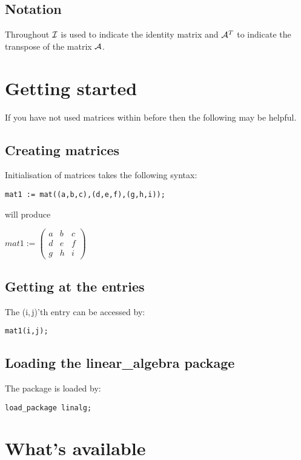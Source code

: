 \subsection*{Notation}

Throughout ${\cal I}$ is used to indicate the identity matrix and
${\cal A}^T$ to indicate the transpose of the matrix ${\cal A}$.

\section{Getting started}

If you have not used matrices within {\REDUCE} before then the
following may be helpful.

\subsection*{Creating matrices}

Initialisation of matrices takes the following syntax:

{\tt mat1 := mat((a,b,c),(d,e,f),(g,h,i));}

will produce

\begin{flushleft}
\begin{math}
mat1 := \left( \begin{array}{ccc} a & b & c \\ d & e & f \\ g & h & i
\end{array} \right)
\end{math}
\end{flushleft}

\subsection*{Getting at the entries}

The (i,$\,$j)'th entry can be accessed by:

{\tt mat1(i,j);}

\subsection*{Loading the linear\_algebra package}

The package is loaded by:

{\tt load\_package linalg;}


\section{What's available}

